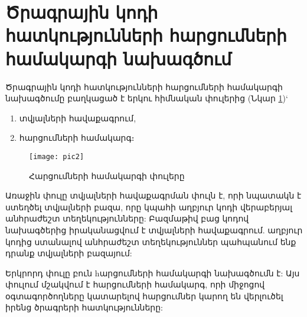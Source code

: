 {
    \section{Ծրագրային կոդի հատկությունների հարցումների համակարգի նախագծում}\label{sec:queryEngineDesign}
    Ծրագրային կոդի հատկությունների հարցումների համակարգի նախագծումը բաղկացած է երկու հիմնական փուլերից (Նկար \ref{fig:figure2})`
    \begin{enumerate}
        \item տվյալների հավաքագրում,
        \item հարցումների համակարգ։
    \end{enumerate}

    \begin{figure}[h]
        \centering
        \texttt{[image: pic2]}
        \caption{Հարցումների համակարգի փուլերը}
        \label{fig:figure2}
    \end{figure}

    Առաջին փուլը տվյալների հավաքագրման փուլն է, որի նպատակն է ստեղծել տվյալների բազա, որը կպահի աղբյուր կոդի
    վերաբերյալ անհրաժեշտ տեղեկությունները:
    Բազմաթիվ բաց կոդով նախագծերից իրականացվում է տվյալների հավաքագրում.
    աղբյուր կոդից ստանալով անհրաժեշտ տեղեկություններ պահպանում ենք դրանք տվյալների բազայում:

    Երկրորդ փուլը բուն hարցումների համակարգի նախագծումն է: Այս փուլում մշակվում է հարցումների համակարգ, որի միջոցով
    օգտագործողները կատարելով հարցումներ կարող են վերլուծել իրենց ծրագրերի հատկությունները:

    

    
}

